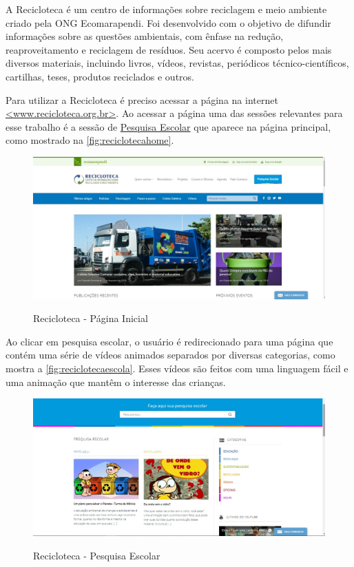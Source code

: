 \documentclass[
	12pt,				%
	openany,			%
	twoside,			%
	a4paper,			%
	english,			%
	french,				%
	spanish,			%
	brazil				%
	]{abntex2}
\begin{document}
A Recicloteca é um centro de informações sobre reciclagem e meio ambiente criado pela ONG Ecomarapendi. Foi desenvolvido com o objetivo de difundir informações sobre as questões ambientais, com ênfase na redução, reaproveitamento e reciclagem de resíduos. Seu acervo é composto pelos mais diversos materiais, incluindo livros, vídeos, revistas, periódicos técnico-científicos, cartilhas, teses, produtos reciclados e outros.

Para utilizar a Recicloteca é preciso acessar a página na internet \href{http://www.recicloteca.org.br/}{<www.recicloteca.org.br>}. Ao acessar a página uma das sessões relevantes para esse trabalho é a sessão de \href{http://www.recicloteca.org.br/pesquisa/}{Pesquisa Escolar} que aparece na página principal, como mostrado na \autoref{fig:reciclotecahome}.

\begin{figure}[h]
\centering
   \caption{Recicloteca - Página Inicial}
   \includegraphics[scale=0.40]{media/reciclotecahome.jpg}
     \label{fig:reciclotecahome}
\end{figure}

Ao clicar em pesquisa escolar, o usuário é redirecionado para uma página que contém uma série de vídeos animados separados por diversas categorias, como mostra a \autoref{fig:reciclotecaescola}. Esses vídeos são feitos com uma linguagem fácil e uma animação que mantêm o interesse das crianças.

\begin{figure}[h]
\centering
   \caption{Recicloteca - Pesquisa Escolar}
   \includegraphics[scale=0.40]{media/reciclotecaescola.jpg}
     \label{fig:reciclotecaescola}
\end{figure}
\end{document}
